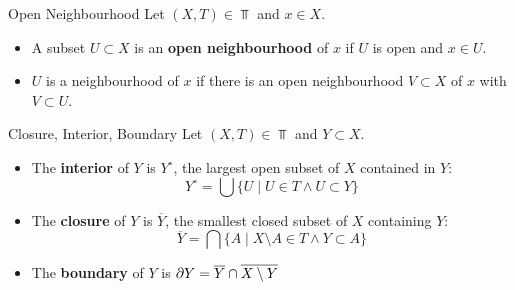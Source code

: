 \begin{definition}{Open Neighbourhood}{}
    Let $(X,T)\in\Top$ and $x\in X$. \begin{itemize}
        \item A subset $U\subset X$ is an \textbf{open neighbourhood} of $x$ if $U$ is open and $x\in U$.
        \item $U$ is a neighbourhood of $x$ if there is an open neighbourhood $V\subset X$ of $x$ with $V\subset U$.
    \end{itemize}
\end{definition}

\begin{definition}{Closure, Interior, Boundary}{}
    Let $(X,T)\in\Top$ and $Y\subset X$. \begin{itemize}
        \item The \textbf{interior} of $Y$ is $Y^\circ$, the largest open subset of $X$ contained in $Y$: \[
        Y^\circ=\bigcup\{U\mid U\in T \land U\subset Y\}
        \]
        \item The \textbf{closure} of $Y$ is $\overline{Y}$, the smallest closed subset of $X$ containing $Y$: \[
        \overline{Y}=\bigcap \{A\mid X\setminus A \in T \land Y\subset A\}
        \]
        \item The \textbf{boundary} of $Y$ is $\partial Y=\overline Y \cap \overline{X\setminus Y}$
    \end{itemize}
\end{definition}

\newpage

